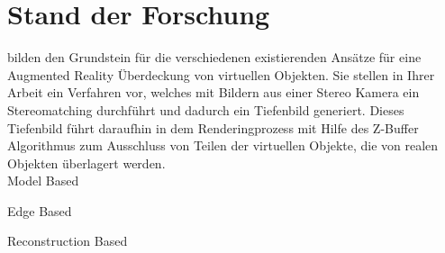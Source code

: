 \section{Stand der Forschung}

\citet{wloka1995resolving} bilden den Grundstein für die verschiedenen existierenden Ansätze für eine Augmented Reality Überdeckung von virtuellen Objekten. Sie stellen in Ihrer Arbeit ein Verfahren vor, welches mit Bildern aus einer Stereo Kamera ein Stereomatching durchführt und dadurch ein Tiefenbild generiert. Dieses Tiefenbild führt daraufhin in dem Renderingprozess mit Hilfe des Z-Buffer Algorithmus zum Ausschluss von Teilen der virtuellen Objekte, die von realen Objekten überlagert werden. \\

Model Based

Edge Based

Reconstruction Based

